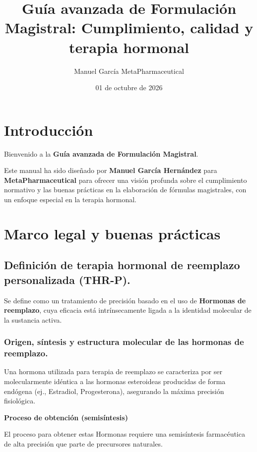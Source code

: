 \documentclass[
  spanish,
]{article}
\title{Guía avanzada de Formulación Magistral: Cumplimiento, calidad y terapia hormonal}
\author{Manuel García \textbar{} MetaPharmaceutical}
\date{01 de octubre de 2026}
\begin{document}
\maketitle

{
\setcounter{tocdepth}{3}
\tableofcontents
}
\section{Introducción}\label{index}

Bienvenido a la \textbf{Guía avanzada de Formulación Magistral}.

Este manual ha sido diseñado por \textbf{Manuel García Hernández} para \textbf{MetaPharmaceutical} para ofrecer una visión profunda sobre el cumplimiento normativo y las buenas prácticas en la elaboración de fórmulas magistrales, con un enfoque especial en la terapia hormonal.

\section{Marco legal y buenas prácticas}\label{intro}

\subsection{Definición de terapia hormonal de reemplazo personalizada (THR-P).}\label{definiciuxf3n-de-terapia-hormonal-de-reemplazo-personalizada-thr-p.}

Se define como un tratamiento de precisión basado en el uso de \textbf{Hormonas de reemplazo}, cuya eficacia está intrínsecamente ligada a la identidad molecular de la sustancia activa.

\subsubsection{Origen, síntesis y estructura molecular de las hormonas de reemplazo.}\label{origen-suxedntesis-y-estructura-molecular-de-las-hormonas-de-reemplazo.}

Una hormona utilizada para terapia de reemplazo se caracteriza por ser molecularmente idéntica a las hormonas esteroideas producidas de forma endógena (ej., Estradiol, Progesterona), asegurando la máxima precisión fisiológica.

\textbf{Proceso de obtención (semisíntesis)}

El proceso para obtener estas Hormonas requiere una semisíntesis farmacéutica de alta precisión que parte de precursores naturales.
\end{document}
